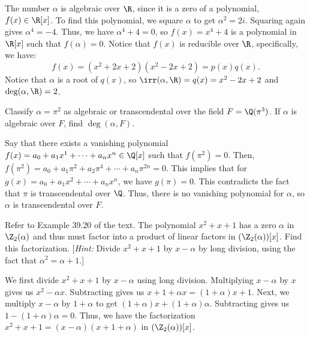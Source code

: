 \begin{solution}
  The number $\alpha$ is algebraic over $\R$, since it is a zero of a polynomial, $f(x) \in \R[x]$. To find this polynomial, we square $\alpha$ to get $\alpha^2 = 2i$. Squaring again gives $\alpha^4 = -4$. Thus, we have $\alpha^4 + 4 = 0$, so $f(x) = x^4 + 4$ is a polynomial in $\R[x]$ such that $f(\alpha) = 0$. Notice that $f(x)$ is reducible over $\R$, specifically, we have:
  \[%
    f(x) = \left(x^2 + 2x + 2\right)\left(x^2 - 2x + 2\right) = p(x)q(x)
  .\]%
  Notice that $\alpha$ is a root of $q(x)$, so $\irr(\alpha, \R) = q(x) = x^2 - 2x + 2$ and $\deg(\alpha, \R) = 2$.
\end{solution}

\begin{problem}[39.16]
  Classify $\alpha = \pi^2$ as algebraic or transcendental over the field $F = \Q(\pi^3)$. If $\alpha$ is algebraic over $F$, find $\deg(\alpha, F)$.
\end{problem}

\begin{solution}
  Say that there exists a vanishing polynomial $f(x) = a_0 + a_1x^1 + \cdots + a_nx^n \in \Q[x]$ such that $f(\pi^2) = 0$. Then, $f(\pi^2) = a_0 + a_1\pi^2 + a_2\pi^4 + \cdots + a_n\pi^{2n} = 0$. This implies that for $g(x) = a_0 + a_1x^2 + \cdots + a_nx^n$, we have $g(\pi) = 0$. This contradicts the fact that $\pi$ is transcendental over $\Q$. Thus, there is no vanishing polynomial for $\alpha$, so $\alpha$ is transcendental over $F$.
\end{solution}

\begin{problem}[39.17]
  Refer to Example 39.20 of the text. The polynomial $x^2 + x + 1$ has a zero $\alpha$ in $\Z_2(\alpha)$ and thus must factor into a product of linear factors in $(\Z_2(\alpha))[x]$. Find this factorization. [\textit{Hint:} Divide $x^2 + x + 1$ by $x - \alpha$ by long division, using the fact that $\alpha^2 = \alpha + 1$.]
\end{problem}

\begin{solution}
  We first divide $x^2 + x + 1$ by $x - \alpha$ using long division. Multiplying $x - \alpha$ by $x$ gives us $x^2 - \alpha x$. Subtracting gives us $x + 1 + \alpha x = (1 + \alpha)x + 1$. Next, we multiply $x - \alpha$ by $1 + \alpha$ to get $(1 + \alpha)x + (1 + \alpha)\alpha$. Subtracting gives us $1 - (1 + \alpha)\alpha = 0$. Thus, we have the factorization $x^2 + x + 1 = (x - \alpha)(x + 1 + \alpha)$ in $(\Z_2(\alpha))[x]$.
\end{solution}

